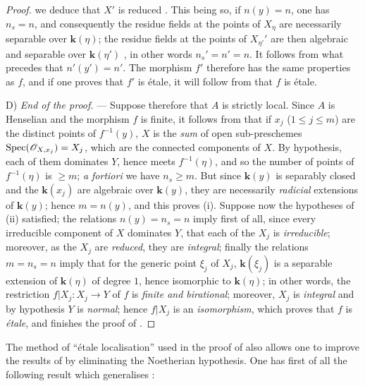 \begin{proof}
we deduce that $X'$ is reduced .
This being so, if $n(y)=n$, one has $n_s=n$, and consequently the residue fields at the points of $X_\eta$ are necessarily separable over $\boldsymbol{k}(\eta)$; the residue fields at the points of $X_{\eta'}'$ are then algebraic and separable over $\boldsymbol{k}(\eta')$ , in other words $n_s'=n'=n$. It follows from what precedes that $n'(y')=n'$.
The morphism $f'$ therefore has the same properties as $f$, and if one proves that $f'$ is \'etale, it will follow from  that $f$ is \'etale.

D) \emph{End of the proof.} ---
Suppose therefore that $A$ is strictly local.
Since $A$ is Henselian and the morphism $f$ is finite, it follows from  that if $x_j$ ($1\leq j\leq m$) are the distinct points of $f^{-1}(y)$, $X$ is the \emph{sum} of open sub-preschemes $\operatorname{Spec}(\mathscr{O}_{X,x_j})=X_j$, which are the connected components of $X$.
By hypothesis, each of them dominates $Y$, hence meets $f^{-1}(\eta)$, and so the number of points of $f^{-1}(\eta)$ is $\geq m$; \emph{a fortiori} we have $n_s\geq m$.
But since $\boldsymbol{k}(y)$ is separably closed and the $\boldsymbol{k}(x_j)$ are algebraic over $\boldsymbol{k}(y)$, they are necessarily \emph{radicial} extensions of $\boldsymbol{k}(y)$; hence $m=n(y)$, and this proves (i).
Suppose now the hypotheses of (ii) satisfied; the relations $n(y)=n_s=n$ imply first of all, since every irreducible component of $X$ dominates $Y$, that each of the $X_j$ is \emph{irreducible}; moreover, as the $X_j$ are \emph{reduced}, they are \emph{integral}; finally the relations $m=n_s=n$ imply that for the generic point $\xi_j$ of $X_j$, $\boldsymbol{k}(\xi_j)$ is a separable extension of $\boldsymbol{k}(\eta)$ of degree $1$, hence isomorphic to $\boldsymbol{k}(\eta)$; in other words, the restriction $f|X_j:X_j\to Y$ of $f$ is \emph{finite and birational}; moreover, $X_j$ is \emph{integral} and by hypothesis $Y$ is \emph{normal}; hence  $f|X_j$ is an \emph{isomorphism}, which proves that $f$ is \emph{\'etale}, and finishes the proof of .
\end{proof}

\begin{remark}[18.10.17]
\label{IV.18.10.17}
The method of ``\'etale localisation'' used in the proof of  also allows one to improve the results of  by eliminating the Noetherian hypothesis.
One has first of all the following result which generalises :
\end{remark}

